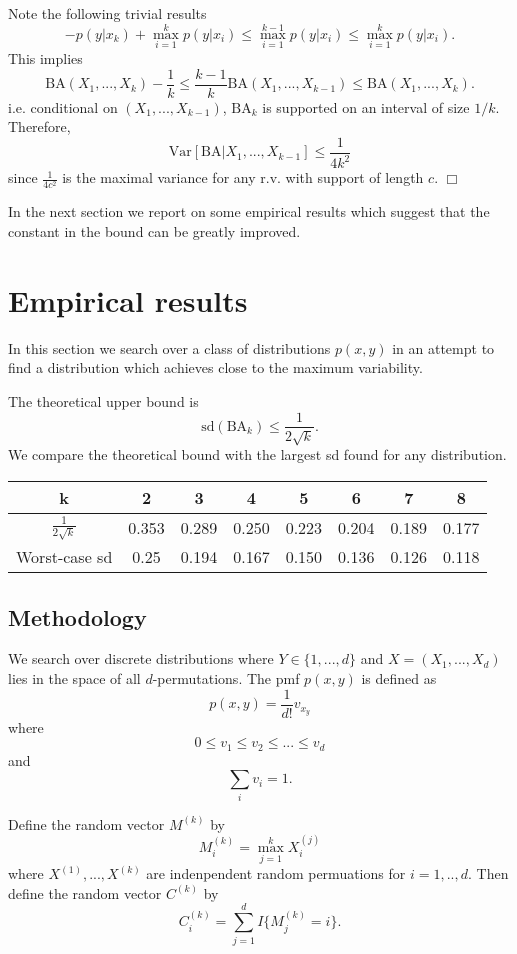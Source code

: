 \documentclass[12pt]{article}
\begin{document}
Note the following trivial results
\[
-p(y|x_k) + \max_{i=1}^k p(y|x_i)\leq \max_{i=1}^{k-1} p(y|x_i) \leq \max_{i=1}^k p(y|x_i).
\]
This implies
\[
\text{BA}(X_1,...,X_k) - \frac{1}{k} \leq \frac{k-1}{k}\text{BA}(X_1,...,X_{k-1}) \leq \text{BA}(X_1,...,X_k).
\]
i.e. conditional on $(X_1,...,X_{k-1})$, $\text{BA}_k$ is supported on an interval of size $1/k$.
Therefore,
\[
\text{Var}[\text{BA}|X_1,...,X_{k-1}] \leq \frac{1}{4k^2}
\]
since $\frac{1}{4c^2}$ is the maximal variance for any r.v. with support of length $c$. $\Box$

In the next section we report on some empirical results which suggest
that the constant in the bound can be greatly improved.

\section{Empirical results}

In this section we search over a class of distributions $p(x, y)$ in
an attempt to find a distribution which achieves close to the maximum
variability.

The theoretical upper bound is
\[
\text{sd}(\text{BA}_k) \leq \frac{1}{2\sqrt{k}}.
\]
We compare the theoretical bound with the largest sd found for any distribution.

\begin{tabular}{c||c|c|c|c|c|c|c}
k & 2 & 3 & 4 & 5 & 6 & 7 & 8\\\hline
$\frac{1}{2\sqrt{k}}$ & 0.353 & 0.289 & 0.250 & 0.223 & 0.204 & 0.189 & 0.177\\\hline
Worst-case sd & 0.25 & 0.194 & 0.167 & 0.150 & 0.136 & 0.126 & 0.118
\end{tabular}

\subsection{Methodology}

We search over discrete distributions where $Y \in \{1, ..., d\}$ and
$X = (X_1,...,X_d)$ lies in the space of all $d$-permutations.
The pmf $p(x, y)$ is defined as
\[
p(x, y) = \frac{1}{d!}v_{x_y}
\]
where
\[
0 \leq v_1 \leq v_2 \leq ... \leq v_d
\]
and
\[
\sum_i v_i = 1.
\]

Define the random vector $M^{(k)}$ by
\[
M^{(k)}_i = \max_{j=1}^k X^{(j)}_i
\]
where $X^{(1)},...,X^{(k)}$ are indenpendent random permuations for $i = 1,..,d$.
Then define the random vector $C^{(k)}$ by
\[
C^{(k)}_i = \sum_{j=1}^d I\{M^{(k)}_j = i\}.
\]
\end{document}
